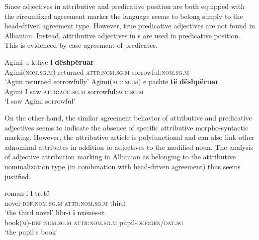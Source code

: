 Since adjectives in attributive and predicative position are both equipped with the circumfixed agreement marker the language seems to belong simply to the head\hyp{}driven agreement type. However, true predicative adjectives are not found in Albanian. Instead, attributive adjectives in s are used in predicative position. This is evidenced by case agreement of predicates.
\begin{exe}
\begin{xlist}
\ex
\gll	Agimi {u kthye} \textbf{i} \textbf{dëshpëruar}\\
	Agimi(\textsc{nom.sg.m}) returned \textsc{attr:nom.sg.m} sorrowful:\textsc{nom.sg.m}\\
\glt	‘Agim returned sorrowfully’
\ex
\gll	Agimi(\textsc{acc.sg.m}) e pashtë \textbf{të} \textbf{dëshpëruar}\\
	Agimi I saw \textsc{attr:acc.sg.m} sorrowful:\textsc{acc.sg.m}\\
\glt	‘I saw Agimi sorrowful’
\end{xlist}
\end{exe}
On the other hand, the similar agreement behavior of attributive and predicative adjectives seems to indicate the absence of specific attributive morpho-syntactic marking. However, the attributive article is polyfunctional and can also link other adnominal attributes in addition to adjectives to the modified noun. The analysis of adjective attribution marking in Albanian as belonging to the attributive nominalization type (in combination with head\hyp{}driven agreement) thus seems justified.
\begin{exe}
\begin{xlist}
\ex
\gll	roman-i 			\textbf{i} 			tretë\\
	novel-\textsc{def:nom.sg.m} \textsc{attr:nom.sg.m} third\\
\glt	‘the third novel’
\ex	
\gll	libr-i 	\textbf{i} nxënës-it\\
	book(\textsc{m})-\textsc{def:nom.sg.m} \textsc{attr:nom.sg.m} pupil-\textsc{def:gen/dat.sg}\\
\glt	‘the pupil's book’
\end{xlist}
\end{exe}

